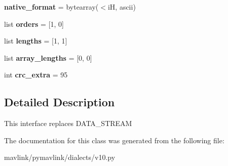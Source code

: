 \begin{DoxyCompactItemize}
{\bfseries native\+\_\+format} = bytearray(\textquotesingle{}$<$iH\textquotesingle{}, \textquotesingle{}ascii\textquotesingle{})
\item 
\mbox{\label{classpymavlink_1_1dialects_1_1v10_1_1MAVLink__message__interval__message_a57cf52c07053754015370272de19ac04}} 
list {\bfseries orders} = \mbox{[}1, 0\mbox{]}
\item 
\mbox{\label{classpymavlink_1_1dialects_1_1v10_1_1MAVLink__message__interval__message_a4d72df53de47739ff1e3008e3680482c}} 
list {\bfseries lengths} = \mbox{[}1, 1\mbox{]}
\item 
\mbox{\label{classpymavlink_1_1dialects_1_1v10_1_1MAVLink__message__interval__message_ae131406bebcce4690dd9baa01ab985a3}} 
list {\bfseries array\+\_\+lengths} = \mbox{[}0, 0\mbox{]}
\item 
\mbox{\label{classpymavlink_1_1dialects_1_1v10_1_1MAVLink__message__interval__message_a14655f5f851ec0128083229194124e17}} 
int {\bfseries crc\+\_\+extra} = 95
\end{DoxyCompactItemize}


\subsection{Detailed Description}
\begin{DoxyVerb}This interface replaces DATA_STREAM
\end{DoxyVerb}
 

The documentation for this class was generated from the following file\+:\begin{DoxyCompactItemize}
\item 
mavlink/pymavlink/dialects/v10.\+py\end{DoxyCompactItemize}
